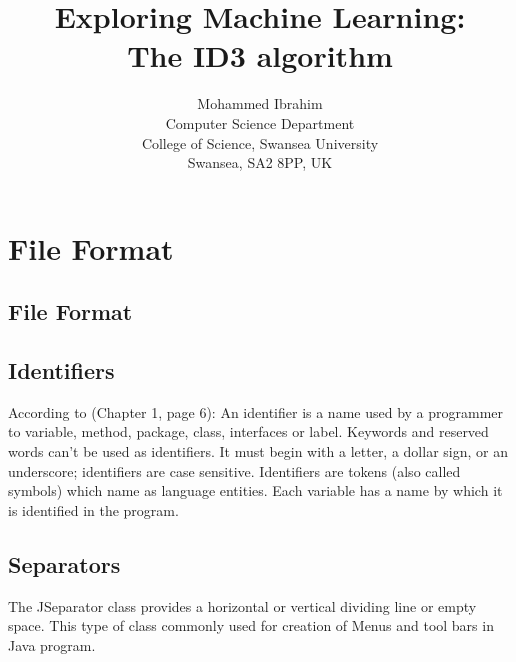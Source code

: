 \documentclass{report}
\begin{document}
\title{Exploring Machine Learning:\\
  The ID3 algorithm}

\author{Mohammed Ibrahim\\
 Computer Science Department\\
  College of Science, Swansea University\\
  Swansea, SA2 8PP, UK
}

\maketitle

\tableofcontents

\chapter{File Format}
\label{sec:fileformat}

\section{File Format}
\label{sec:file}

\section{Identifiers}
\label{sec:ide}

According to \cite{Roberts2000CompleteJava2Certification}(Chapter 1, page 6): An identifier is a name used by a programmer to variable, method, package, class, interfaces or label. Keywords and reserved words can't be used as  identifiers. It must begin with a letter, a dollar sign, or an underscore; identifiers are case sensitive. Identifiers are tokens (also called symbols) which name as language entities. Each variable has a name by which it is identified in the program.


\section{Separators}
\label{sec:sep}

The JSeparator class provides a horizontal or vertical dividing line or empty space. This type of class commonly used for creation of Menus and tool bars  in Java program.
\end{document}
